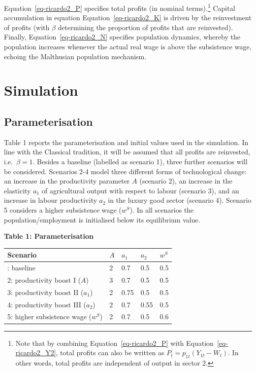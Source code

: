 \documentclass[
  letterpaper,
  DIV=11,
  numbers=noendperiod]{scrreprt}
\begin{document}
Equation~\ref{eq-ricardo2_P} specifies total profits (in nominal
terms).\footnote{Note that by combining Equation~\ref{eq-ricardo2_P}
  with Equation~\ref{eq-ricardo2_Y2}, total profits can also be written
  as \(P_t=p_{1t}(Y_{1t} - W_t)\). In other words, total profits are
  independent of output in sector 2.} Capital accumulation in equation
Equation~\ref{eq-ricardo2_K} is driven by the reinvestment of profits
(with \(\beta\) determining the proportion of profits that are
reinvested). Finally, Equation~\ref{eq-ricardo2_N} specifies population
dynamics, whereby the population increases whenever the actual real wage
is above the subsistence wage, echoing the Malthusian population
mechanism.

\section{Simulation}\label{simulation-11}

\subsection{Parameterisation}\label{parameterisation-11}

Table 1 reports the parameterisation and initial values used in the
simulation. In line with the Classical tradition, it will be assumed
that all profits are reinvested, i.e.~\(\beta=1\). Besides a baseline
(labelled as scenario 1), three further scenarios will be considered.
Scenarios 2-4 model three different forms of technological change: an
increase in the productivity parameter \(A\) (scenario 2), an increase
in the elasticity \(a_1\) of agricultural output with respect to labour
(scenario 3), and an increase in labour productivity \(a_2\) in the
luxury good sector (scenario 4). Scenario 5 considers a higher
subsistence wage (\(w^S\)). In all scenarios the population/employment
is initialised below its equilibrium value.

\textbf{Table 1: Parameterisation}

\begin{longtable}[]{@{}lllll@{}}
\toprule\noalign{}
Scenario & \(A\) & \(a_1\) & \(a_2\) & \(w^S\) \\
\midrule\noalign{}
\endhead
\bottomrule\noalign{}
\endlastfoot
1: baseline & 2 & 0.7 & 0.5 & 0.5 \\
2: productivity boost I (\(A\)) & 3 & 0.7 & 0.5 & 0.5 \\
3: productivity boost II (\(a_1\)) & 2 & 0.75 & 0.5 & 0.5 \\
4: productivity boost III (\(a_2\)) & 2 & 0.7 & 0.55 & 0.5 \\
5: higher subsistence wage (\(w^S\)) & 2 & 0.7 & 0.5 & 0.6 \\
\end{longtable}
\end{document}
